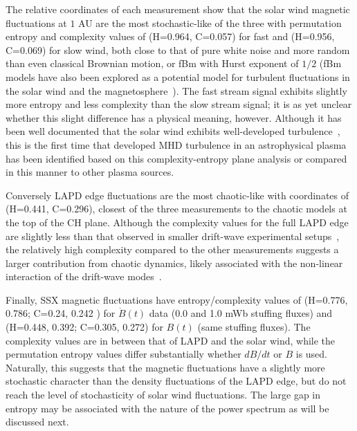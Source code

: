 \documentclass[aps,prx,twocolumn,secnumarabic,nobalancelastpage,amsmath,amssymb,
nofootinbib]{revtex4-1}
\begin{document}
The relative coordinates of each measurement show that the solar wind magnetic fluctuations at $1$ AU are the most stochastic-like of the three with permutation entropy and complexity values of (H=0.964, C=0.057) for fast and (H=0.956, C=0.069) for slow wind, both close to that of pure white noise and more random than even classical Brownian motion, or fBm with Hurst exponent of $1/2$ (fBm models have also been explored as a potential model for turbulent fluctuations in the solar wind and the magnetosphere~\cite{watkins2005}). The fast stream signal exhibits slightly more entropy and less complexity than the slow stream signal; it is as yet unclear whether this slight difference has a physical meaning, however. Although it has been well documented that the solar wind exhibits well-developed turbulence~\cite{bruno2013}, this is the first time that developed MHD turbulence in an astrophysical plasma has been identified based on this complexity-entropy plane analysis or compared in this manner to other plasma sources.

Conversely LAPD edge fluctuations are the most chaotic-like with coordinates of (H=0.441, C=0.296), closest of the three measurements to the chaotic models at the top of the CH plane. Although the complexity values for the full LAPD edge are slightly less than that observed in smaller drift-wave experimental setups~\cite{maggs2013}, the relatively high complexity compared to the other measurements suggests a larger contribution from chaotic dynamics, likely associated with the non-linear interaction of the drift-wave modes~\cite{maggs2012}. 

Finally, SSX magnetic fluctuations have entropy/complexity values of (H=0.776, 0.786; C=0.24, 0.242 ) for $\dot{B}(t)$ data (0.0 and 1.0 mWb stuffing fluxes) and (H=0.448, 0.392; C=0.305, 0.272) for $B(t)$ (same stuffing fluxes). The complexity values are in between that of LAPD and the solar wind, while the permutation entropy values differ substantially whether $dB/dt$ or $B$ is used. Naturally, this suggests that the magnetic fluctuations have a slightly more stochastic character than the density fluctuations of the LAPD edge, but do not reach the level of stochasticity of solar wind fluctuations. The large gap in entropy may be associated with the nature of the power spectrum as will be discussed next.
\end{document}
